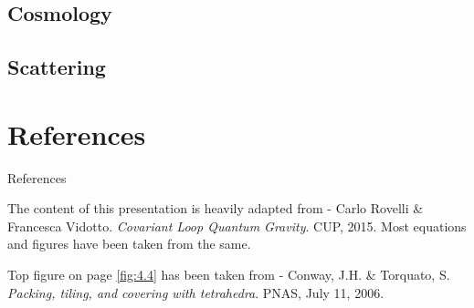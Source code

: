\documentclass{beamer}
\begin{document}
\subsection{Cosmology}

\subsection{Scattering}

\section{References}

\begin{frame}{References}
    \begin{list}{\maltese}{\leftmargin=1em \itemindent=0em}
        \item<1-> The content of this presentation is heavily adapted from - Carlo Rovelli \& Francesca Vidotto. \emph{Covariant Loop Quantum Gravity}. CUP, 2015. Most equations and figures have been taken from the same.
        \item<2-> Top figure on page \ref{fig:4.4} has been taken from - Conway, J.H. \& Torquato, S. \emph{Packing, tiling, and covering with tetrahedra}. PNAS, July 11, 2006.
    \end{list}
\end{frame}
\end{document}
